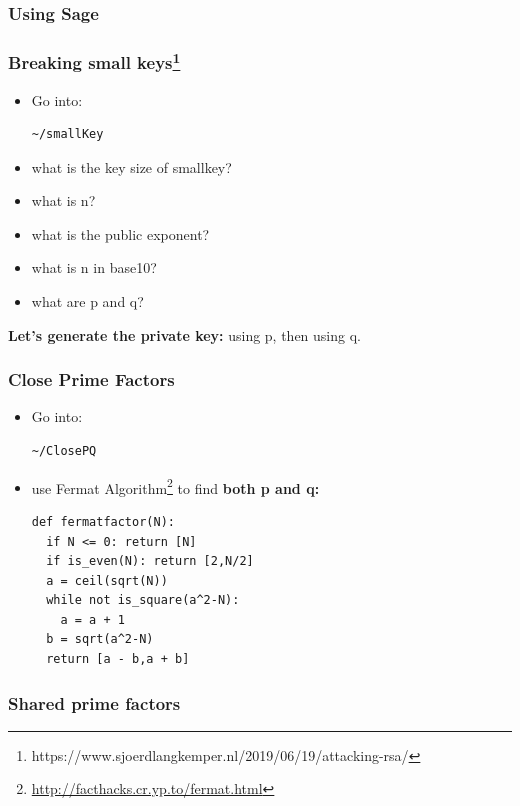 \documentclass{beamer}
\begin{document}
\begin{frame}
  \frametitle{Using Sage}
\end{frame}

\begin{frame}[fragile]
  \frametitle{Breaking small keys\footnote{https://www.sjoerdlangkemper.nl/2019/06/19/attacking-rsa/}}
  \begin{itemize}
  \item Go into:

\begin{lstlisting}
~/smallKey
\end{lstlisting}

   \item what is the key size of smallkey?
   \item what is n?
   \item what is the public exponent?
   \item what is n in base10?
   \item what are p and q?
   
  \end{itemize}

  \vspace{8mm}
  {\bf Let's generate the private key: }using p, then using q.
  
\end{frame}

\begin{frame}[fragile]
  \frametitle{Close Prime Factors}
  \begin{itemize}
  \item Go into:
\begin{lstlisting}
~/ClosePQ
\end{lstlisting}

   \item use Fermat Algorithm\footnote{\url{http://facthacks.cr.yp.to/fermat.html}} to find {\bf both p and q:}

\begin{lstlisting}
def fermatfactor(N):
  if N <= 0: return [N]
  if is_even(N): return [2,N/2]
  a = ceil(sqrt(N))
  while not is_square(a^2-N):
    a = a + 1
  b = sqrt(a^2-N)
  return [a - b,a + b]
\end{lstlisting}

  \end{itemize}
 
\end{frame}



\begin{frame}
  \frametitle{Shared prime factors}
\end{frame}
\end{document}
